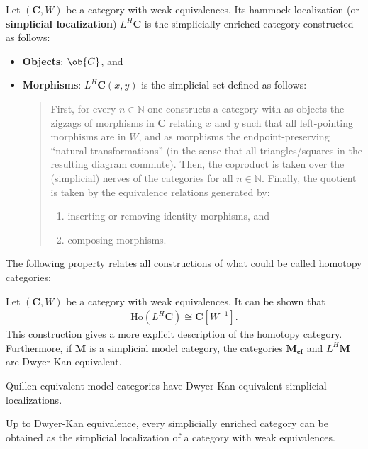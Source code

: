     \begin{construct}
        Let $(\mathbf{C},W)$ be a category with weak equivalences. Its hammock localization (or \textbf{simplicial localization}) $L^H\mathbf{C}$ is the simplicially enriched category constructed as follows:
        \begin{itemize}
            \item\textbf{Objects}: $\ob{C}$, and
            \item\textbf{Morphisms}: $L^H\mathbf{C}(x,y)$ is the simplicial set defined as follows:
            \begin{quote}
                First, for every $n\in\mathbb{N}$ one constructs a category with as objects the zigzags of morphisms in $\mathbf{C}$ relating $x$ and $y$ such that all left-pointing morphisms are in $W$, and as morphisms the endpoint-preserving ``natural transformations'' (in the sense that all triangles/squares in the resulting diagram commute). Then, the coproduct is taken over the (simplicial) nerves of the categories for all $n\in\mathbb{N}$. Finally, the quotient is taken by the equivalence relations generated by:
                \begin{enumerate}
                    \item inserting or removing identity morphisms, and
                    \item composing morphisms.
                \end{enumerate}
            \end{quote}
        \end{itemize}
    \end{construct}

    The following property relates all constructions of what could be called homotopy categories:
    \begin{property}
        Let $(\mathbf{C},W)$ be a category with weak equivalences. It can be shown that
        \begin{gather}
            \mathrm{Ho}(L^H\mathbf{C})\cong\mathbf{C}[W^{-1}].
        \end{gather}
        This construction gives a more explicit description of the homotopy category. Furthermore, if $\mathbf{M}$ is a simplicial model category, the categories $\mathbf{M_{cf}}$ and $L^H\mathbf{M}$ are Dwyer-Kan equivalent.
    \end{property}
    \begin{property}
        Quillen equivalent model categories have Dwyer-Kan equivalent simplicial localizations.
    \end{property}
    \begin{property}
        Up to Dwyer-Kan equivalence, every simplicially enriched category can be obtained as the simplicial localization of a category with weak equivalences.
    \end{property}

